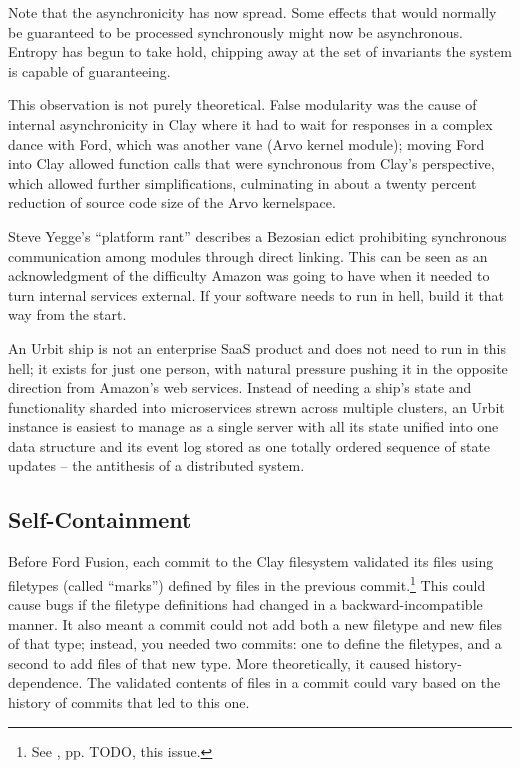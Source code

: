 \documentclass[twoside]{article}
\begin{document}
Note that the asynchronicity has now spread. Some effects that would normally be guaranteed to be processed synchronously might now be asynchronous. Entropy has begun to take hold, chipping away at the set of invariants the system is capable of guaranteeing.

This observation is not purely theoretical. False modularity was the cause of internal asynchronicity in Clay where it had to wait for responses in a complex dance with Ford, which was another vane (Arvo kernel module); moving Ford into Clay allowed function calls that were synchronous from Clay’s perspective, which allowed further simplifications, culminating in about a twenty percent reduction of source code size of the Arvo kernelspace.

Steve Yegge's ``platform rant'' \citep{Yegge2011} describes a Bezosian
edict prohibiting synchronous communication among modules through direct
linking. This can be seen as an acknowledgment of the difficulty Amazon
was going to have when it needed to turn internal services external. If
your software needs to run in hell, build it that way from the start.

An Urbit ship is not an enterprise SaaS product and does not need to run in this hell; it exists for just one person, with natural pressure pushing it in the opposite direction from Amazon’s web services. Instead of needing a ship’s state and functionality sharded into microservices strewn across multiple clusters, an Urbit instance is easiest to manage as a single server with all its state unified into one data structure and its event log stored as one totally ordered sequence of state updates – the antithesis of a distributed system.

\subsection{Self-Containment}

Before Ford Fusion, each commit to the Clay filesystem validated its files using filetypes (called ``marks'') defined by files in the previous commit.\footnote{See , pp. TODO, this issue.} This could cause bugs if the filetype definitions had changed in a backward-incompatible manner. It also meant a commit could not add both a new filetype and new files of that type; instead, you needed two commits: one to define the filetypes, and a second to add files of that new type. More theoretically, it caused history-dependence. The validated contents of files in a commit could vary based on the history of commits that led to this one.
\end{document}
